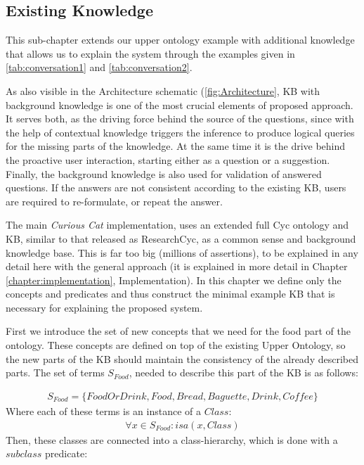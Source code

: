 \subsection{Existing Knowledge}
\label{section:existingKB}
This sub-chapter extends our upper ontology example with additional knowledge
that allows us to explain the system through the examples given in 
\autoref{tab:conversation1} and \autoref{tab:conversation2}. 

As also visible in the Architecture schematic (\autoref{fig:Architecture},
KB with background knowledge is one of the most crucial elements of proposed 
approach. It serves both, as the driving force behind the source of the 
questions, since with the help of contextual knowledge triggers the inference to
produce logical queries for the missing parts of the knowledge. At the same time
it is the drive behind the proactive user interaction, starting either as a
question or a suggestion. Finally, the background knowledge is also used for 
validation of answered questions. If the answers are not consistent according
to the existing KB, users are required to re-formulate, or repeat the answer.

The main \emph{Curious Cat} implementation, uses an extended 
full Cyc ontology and KB, similar to that released as ResearchCyc, as a 
common sense and background knowledge base. This is far too big (millions of 
assertions), to be explained in any detail here with the general approach (it 
is explained in more detail in Chapter \ref{chapter:implementation}, 
Implementation). In this chapter we define only the concepts and predicates 
and thus construct the minimal example KB that is necessary for explaining the
proposed system.

First we introduce the set of new concepts that we need for the food part
of the ontology. These concepts are defined on top of the existing Upper 
Ontology, so the new parts of the KB should maintain the consistency of the
already described parts. The set of terms $S_{Food} $, needed to describe this 
part of the KB is as follows:

\begin{equation}\label{set:foodTerms}
\begin{gathered}
S_{Food} = \{FoodOrDrink,Food,Bread,Baguette,Drink,Coffee\}
\end{gathered}
\end{equation}
Where each of these terms is an instance of a $Class$:
\begin{equation}\label{set:foodTermsClass}
\begin{gathered}
\forall x \in S_{Food}: isa(x,Class)
\end{gathered}
\end{equation}
Then, these classes are connected into a class-hierarchy, which is done with
a $subclass$ predicate:


